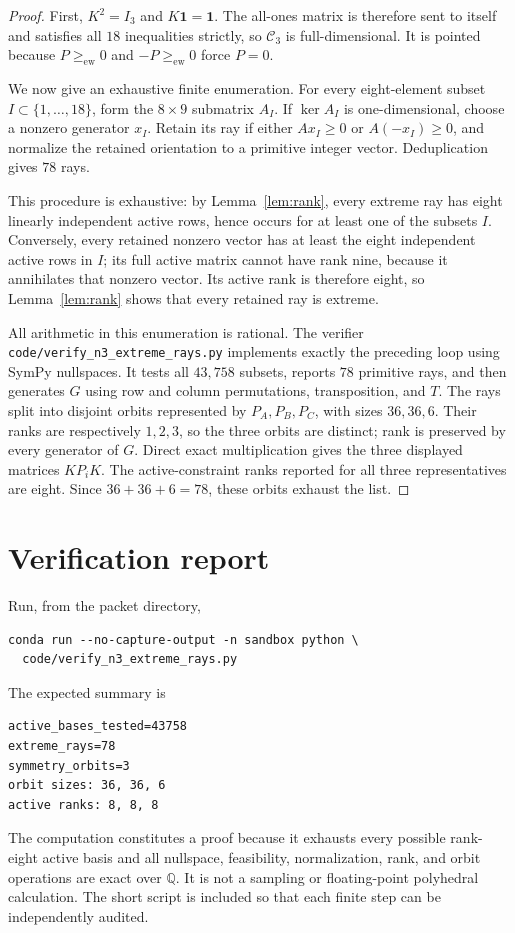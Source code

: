 \documentclass[11pt]{article}
\newcommand{\C}{\mathcal C}
\newcommand{\ew}{\mathrm{ew}}
\begin{document}
\begin{proof}
First, $K^2=I_3$ and $K\mathbf1=\mathbf1$.  The all-ones matrix is therefore
sent to itself and satisfies all $18$ inequalities strictly, so $\C_3$ is
full-dimensional.  It is pointed because $P\geq_{\ew}0$ and
$-P\geq_{\ew}0$ force $P=0$.

We now give an exhaustive finite enumeration.  For every eight-element subset
$I\subset\{1,\ldots,18\}$, form the $8\times9$ submatrix $A_I$.  If
$\ker A_I$ is one-dimensional, choose a nonzero generator $x_I$.  Retain its
ray if either $Ax_I\geq0$ or $A(-x_I)\geq0$, and normalize the retained
orientation to a primitive integer vector.  Deduplication gives $78$ rays.

This procedure is exhaustive: by Lemma~\ref{lem:rank}, every extreme ray has
eight linearly independent active rows, hence occurs for at least one of the
subsets $I$.  Conversely, every retained nonzero vector has at least the eight
independent active rows in $I$; its full active matrix cannot have rank nine,
because it annihilates that nonzero vector.  Its active rank is therefore
eight, so Lemma~\ref{lem:rank} shows that every retained ray is extreme.

All arithmetic in this enumeration is rational.  The verifier
\texttt{code/verify\_n3\_extreme\_rays.py} implements exactly the preceding
loop using SymPy nullspaces.  It tests all $43{,}758$ subsets, reports $78$
primitive rays, and then generates $G$ using row and column permutations,
transposition, and $T$.  The rays split into disjoint orbits represented by
$P_A,P_B,P_C$, with sizes $36,36,6$.  Their ranks are respectively $1,2,3$,
so the three orbits are distinct; rank is preserved by every generator of
$G$.  Direct exact multiplication gives the three displayed matrices $KP_iK$.
The active-constraint ranks reported for all three representatives are eight.
Since $36+36+6=78$, these orbits exhaust the list.
\end{proof}

\section*{Verification report}

Run, from the packet directory,
\begin{verbatim}
conda run --no-capture-output -n sandbox python \
  code/verify_n3_extreme_rays.py
\end{verbatim}
The expected summary is
\begin{verbatim}
active_bases_tested=43758
extreme_rays=78
symmetry_orbits=3
orbit sizes: 36, 36, 6
active ranks: 8, 8, 8
\end{verbatim}
The computation constitutes a proof because it exhausts every possible
rank-eight active basis and all nullspace, feasibility, normalization, rank,
and orbit operations are exact over $\mathbb Q$.  It is not a sampling or
floating-point polyhedral calculation.  The short script is included so that
each finite step can be independently audited.
\end{document}

